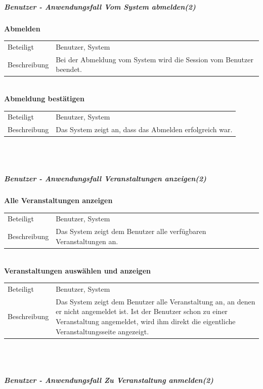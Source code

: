 \documentclass[12pt,a4paper]{article}
\begin{document}
\subparagraph{Benutzer - Anwendungsfall \glqq Vom System abmelden\grqq (2)}\mbox{}

\textbf{Abmelden}\\
\begin{tabular}{l|p{12cm}}
\hline 
Beteiligt & Benutzer, System \\ 
Beschreibung & Bei der Abmeldung vom System wird die Session vom Benutzer beendet.\\ 
\end{tabular}\\

\textbf{Abmeldung bestätigen}\\
\begin{tabular}{l|p{12cm}}
\hline 
Beteiligt & Benutzer, System \\ 
Beschreibung &  Das System zeigt an, dass das Abmelden erfolgreich war. \\ 
\end{tabular}\\\\



\subparagraph{Benutzer - Anwendungsfall \glqq Veranstaltungen anzeigen\grqq (2)}\mbox{}

\textbf{Alle Veranstaltungen anzeigen}\\
\begin{tabular}{l|p{12cm}}
\hline 
Beteiligt & Benutzer, System  \\ 
Beschreibung & Das System zeigt dem Benutzer alle verfügbaren Veranstaltungen an. \\ 
\end{tabular}\\ 

\textbf{Veranstaltungen auswählen und anzeigen}\\
\begin{tabular}{l|p{12cm}}
\hline 
Beteiligt & Benutzer, System \\ 
Beschreibung & Das System zeigt dem Benutzer alle Veranstaltung an, an denen er nicht angemeldet ist. Ist der Benutzer schon zu einer Veranstaltung angemeldet, wird ihm direkt die eigentliche Veranstaltungsseite angezeigt. \\ 
\end{tabular} \\\\

\newpage

\subparagraph{Benutzer - Anwendungsfall \glqq Zu Veranstaltung anmelden\grqq (2)}\mbox{}
\end{document}
